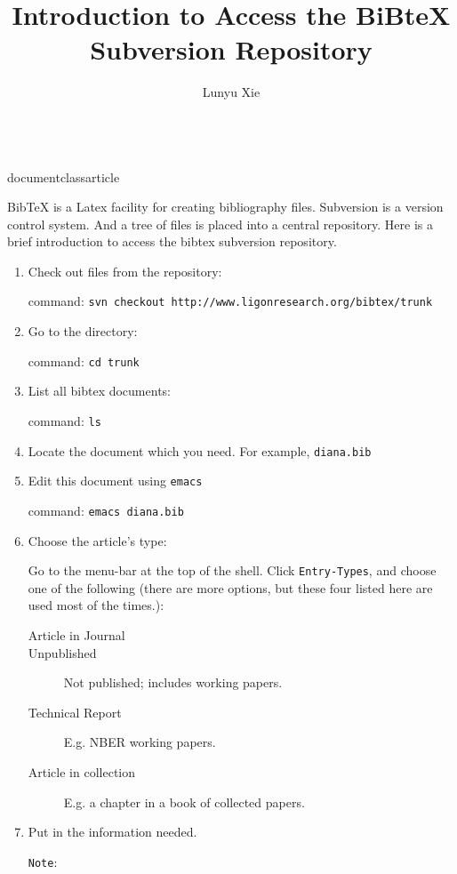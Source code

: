 \\documentclass{article}
\begin{document}
\title{Introduction to Access the BiBteX Subversion Repository}
\author{Lunyu Xie}
\maketitle

BibTeX is a Latex facility for creating bibliography files. Subversion is a version control system. And a tree of files is placed into a central repository. Here is a brief introduction to access the bibtex subversion repository.

\begin{enumerate}
\item{Check out files from the repository:

command: \texttt{svn checkout http://www.ligonresearch.org/bibtex/trunk}}

\item{Go to the directory:

command: \texttt{cd trunk}}


\item{List all bibtex documents:

command: \texttt{ls}}


\item{Locate the document which you need. For example, \texttt{diana.bib}}


\item{Edit this document using \texttt{emacs}

command: \texttt{emacs diana.bib}}


\item{Choose the article's type:

    Go to the menu-bar at the top of the shell. Click
    \texttt{Entry-Types}, and choose one of the following (there are more options, but these four listed here are used most of the times.):
    \begin{description}
    \item[Article in Journal]
    \item[Unpublished]{Not published; includes working papers.}
    \item[Technical Report]{E.g. NBER working papers.}
    \item[Article in collection]{E.g. a chapter in a book of collected papers.}
    \end{description}}

\item{Put in the information needed.

\texttt{Note}: 

}
\end{enumerate}
\end{document}

